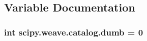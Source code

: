 \subsection{Variable Documentation}
\hypertarget{namespacescipy_1_1weave_1_1catalog_aa001d0ba8c28047649282ca5ff3583a6}{}
\subsubsection[{dumb}]{\setlength{\rightskip}{0pt plus 5cm}int scipy.\+weave.\+catalog.\+dumb = 0}\label{namespacescipy_1_1weave_1_1catalog_aa001d0ba8c28047649282ca5ff3583a6}
